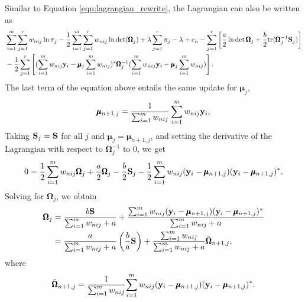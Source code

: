 \documentclass{scrartcl}
\begin{document}
Similar to Equation \eqref{eqn:lagrangian_rewrite}, the Lagrangian can also be written as
\begin{equation}
\begin{split}
& \sum_{i=1}^m \sum_{j=1}^r { w_{nij} } \ln \pi_j - {1 \over 2} \sum_{i=1}^m \sum_{j=1}^r w_{nij} \ln \det(\pmb{\Omega}_j) + \lambda \sum_{j=1}^r \pi_j - \lambda + c_n
- \sum_{j=1}^r \left[ {a \over 2} \ln \det \pmb{\Omega}_j + {b \over 2} \mathrm{tr}(\pmb{\Omega}_j^{-1}\mathbf{S}_j) \right] \\
& - {1\over 2} \sum_{j=1}^r \left[ ( \sum_{i=1}^m w_{nij} \mathbf{y}_i-\pmb{\mu}_j \sum_{i=1}^m w_{nij})^*\pmb{\Omega}_j^{-1}
( \sum_{i=1}^m w_{nij} \mathbf{y}_i-\pmb{\mu}_j \sum_{i=1}^m w_{nij}) \right].
\end{split}
\end{equation}
The last term of the equation above entails the same update for $\pmb{\mu}_j$,
\begin{equation}
\pmb{\mu}_{n+1,j} = {1 \over \sum_{i=1}^m w_{nij}}\sum_{i=1}^m w_{nij} \mathbf{y}_i,
\end{equation}
Taking $\mathbf{S}_j = \mathbf{S}$ for all $j$ and $\pmb{\mu}_j = \pmb{\mu}_{n+1,j}$, and setting the derivative of the Lagrangian with respect to
$\pmb{\Omega}_j^{-1}$ to 0, we get
\begin{equation}
0 = {1 \over 2} \sum_{i=1}^m w_{nij} \pmb{\Omega}_j + {a \over 2} \pmb{\Omega}_j - {b \over 2} \mathbf{S}_j
-{1 \over 2} \sum_{i=1}^m w_{nij}(\mathbf{y}_i-\pmb{\mu}_{n+1,j})(\mathbf{y}_i-\pmb{\mu}_{n+1,j})^*.
\end{equation}
Solving for $\pmb{\Omega}_j$, we obtain
\begin{equation}
\begin{split}
\pmb{\Omega}_j & = {{b \mathbf{S}} \over {\sum_{i=1}^m w_{nij}+a}}
+ { {\sum_{i=1}^m w_{nij}(\mathbf{y}_i-\pmb{\mu}_{n+1,j})(\mathbf{y}_i-\pmb{\mu}_{n+1,j})^*} \over {\sum_{i=1}^m w_{nij}+a}} \\
& = {a \over {\sum_{i=1}^m w_{nij}+a}} \left( {b \over a} \mathbf{S} \right)
+ { {\sum_{i=1}^m w_{nij}} \over {\sum_{i=1}^m w_{nij}+a} } \tilde{\pmb{\Omega}}_{n+1,j},
\end{split}
\end{equation}
where
\begin{equation}
\tilde{\pmb{\Omega}}_{n+1,j} = {1 \over {\sum_{i=1}^m w_{nij}}} {\sum_{i=1}^m w_{nij}(\mathbf{y}_i-\pmb{\mu}_{n+1,j})(\mathbf{y}_i-\pmb{\mu}_{n+1,j})^*}.
\end{equation}


\end{document}
